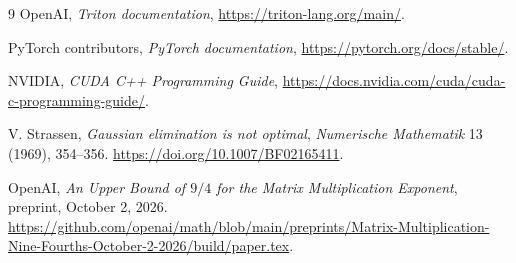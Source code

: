 \documentclass[11pt,letterpaper]{article}
\begin{document}
\begin{thebibliography}{9}
OpenAI, \emph{Triton documentation},
\url{https://triton-lang.org/main/}.

PyTorch contributors, \emph{PyTorch documentation},
\url{https://pytorch.org/docs/stable/}.

NVIDIA, \emph{CUDA C++ Programming Guide},
\url{https://docs.nvidia.com/cuda/cuda-c-programming-guide/}.

V. Strassen, \emph{Gaussian elimination is not optimal},
\emph{Numerische Mathematik} 13 (1969), 354--356.
\url{https://doi.org/10.1007/BF02165411}.

OpenAI, \emph{An Upper Bound of $9/4$ for the Matrix Multiplication Exponent},
preprint, October 2, 2026.
\url{https://github.com/openai/math/blob/main/preprints/Matrix-Multiplication-Nine-Fourths-October-2-2026/build/paper.tex}.
\end{thebibliography}
\end{document}
